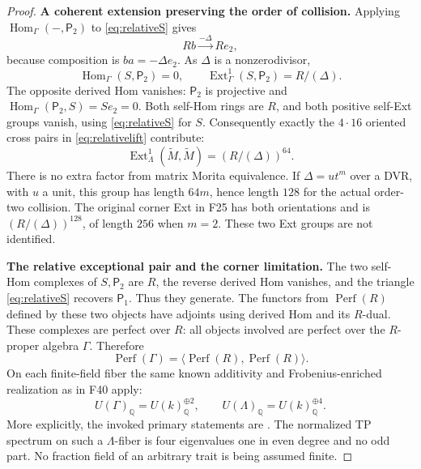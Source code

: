 \documentclass[11pt,a4paper]{article}
\newcommand{\Q}{\mathbb Q}\newcommand{\Z}{\mathbb Z}\newcommand{\C}{\mathbb C}\newcommand{\N}{\mathbb N}\newcommand{\F}{\mathbb F}
\renewcommand{\S}{\ensuremath{\mathsection}}
\newcommand{\fid}[1]{\textsf{#1}}\newcommand{\gate}[1]{\textsf{#1}}
\theoremstyle{named}\newtheorem{finding}{Finding}[section]
\theoremstyle{definition}\newtheorem{definition}[finding]{Definition}
\theoremstyle{remark}\newtheorem{remark}[finding]{Remark}
\begin{document}
\begin{proof}
\par\smallskip\noindent\textbf{A coherent extension preserving the order of collision.}\quad
Applying $\operatorname{Hom}_\Gamma(-,\mathsf P_2)$ to
\eqref{eq:relativeS} gives
\[
 Rb\xrightarrow{-\Delta}Re_2,
\]
because composition is $ba=-\Delta e_2$.
As $\Delta$ is a nonzerodivisor,
\[
 \operatorname{Hom}_\Gamma(S,\mathsf P_2)=0,\qquad
 \operatorname{Ext}^1_\Gamma(S,\mathsf P_2)=R/(\Delta).
\]
The opposite derived Hom vanishes:
$\mathsf P_2$ is projective and
$\operatorname{Hom}_\Gamma(\mathsf P_2,S)=Se_2=0$.
Both self-Hom rings are $R$, and both positive self-Ext
groups vanish, using \eqref{eq:relativeS} for $S$.
Consequently exactly the $4\cdot16$ oriented cross
pairs in \eqref{eq:relativelift} contribute:
\[
 \operatorname{Ext}^1_\Lambda(\widetilde M,\widetilde M)
       =(R/(\Delta))^{64}.
\]
There is no extra factor from matrix Morita equivalence.
If $\Delta=ut^m$ over a DVR, with $u$ a unit, this
group has length $64m$, hence length $128$ for the actual
order-two collision. The original corner Ext in \fid{F25}
has both orientations and is $(R/(\Delta))^{128}$,
of length $256$ when $m=2$. These two Ext groups are
not identified.

\par\smallskip\noindent\textbf{The relative exceptional pair and the corner limitation.}\quad
The two self-Hom complexes of $S,\mathsf P_2$ are $R$,
the reverse derived Hom vanishes, and the triangle
\eqref{eq:relativeS} recovers $\mathsf P_1$. Thus they
generate. The functors from $\operatorname{Perf}(R)$
defined by these two objects have adjoints using derived
Hom and its $R$-dual. These complexes are perfect over
$R$: all objects involved are perfect over the
$R$-proper algebra $\Gamma$. Therefore
\[
 \operatorname{Perf}(\Gamma)
       =\langle\operatorname{Perf}(R),\operatorname{Perf}(R)\rangle.
\]
On each finite-field fiber the same known additivity and
Frobenius-enriched realization as in \fid{F40} apply:
\[
 U(\Gamma)_{\Q}=U(k)_{\Q}^{\oplus2},\qquad
 U(\Lambda)_{\Q}=U(k)_{\Q}^{\oplus4}.
\]
More explicitly, the invoked primary statements are
\cite[Example~12.3, p.~24; \S6.2, equation~(6.9), p.~16;
\S7, equations~(7.1)--(7.4), p.~17]{TabuadaWeil}.
The normalized TP spectrum on such a $\Lambda$-fiber
is four eigenvalues one in even degree and no odd part.
No fraction field of an arbitrary trait is being assumed
finite.


\end{proof}
\end{document}
